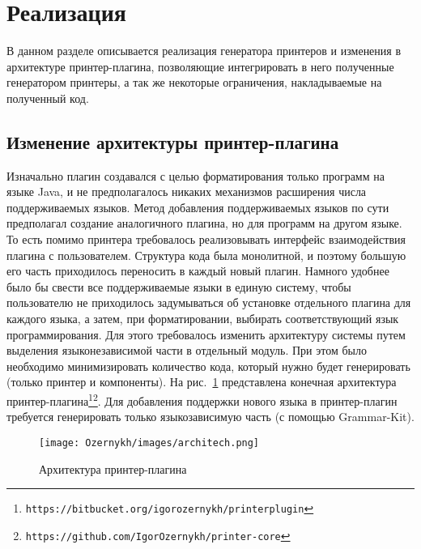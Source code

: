 \section{Реализация}
\label{sec:impl}
\lstset{basicstyle=\normalsize\ttfamily, columns=fullflexible}
В данном разделе описывается реализация генератора принтеров и изменения в архитектуре принтер-плагина, позволяющие интегрировать в него полученные генератором принтеры, а так же некоторые ограничения, накладываемые на полученный код.

\subsection{Изменение архитектуры принтер-плагина}
Изначально плагин создавался с целью форматирования только программ на языке Java, и не предполагалось никаких механизмов расширения числа поддерживаемых языков.
Метод добавления поддерживаемых языков \cite{paper:while} по сути предполагал создание аналогичного плагина, но для программ на другом языке.
То есть помимо принтера требовалось реализовывать интерфейс взаимодействия плагина с пользователем.
Структура кода была монолитной, и поэтому большую его часть приходилось переносить в каждый новый плагин.
Намного удобнее было бы свести все поддерживаемые языки в единую систему, чтобы пользователю не приходилось задумываться об установке отдельного плагина для каждого языка, а затем, при форматировании, выбирать соответствующий язык программирования.
Для этого требовалось изменить архитектуру системы путем выделения языконезависимой части в отдельный модуль.
При этом было необходимо минимизировать количество кода, который нужно будет генерировать (только принтер и компоненты).
На рис.~\ref{impl:architechture} представлена конечная архитектура принтер-плагина\footnote{\texttt{https://bitbucket.org/igorozernykh/printerplugin}}\footnote{\texttt{https://github.com/IgorOzernykh/printer-core}}.
Для добавления поддержки нового языка в принтер-плагин требуется генерировать только языкозависимую часть (с помощью Grammar-Kit).
\begin{figure}[h]
    \centering
    \texttt{[image: Ozernykh/images/architech.png]}
    \caption{Архитектура принтер-плагина}
    \label{impl:architechture}
\end{figure}

